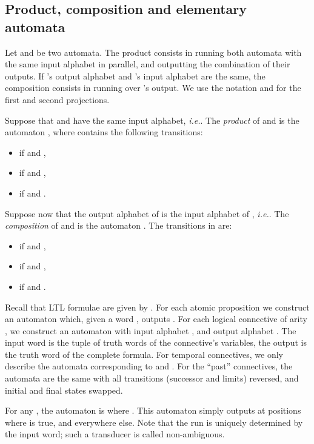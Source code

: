 \documentclass[envcountsame]{fsttcs-ps}
\newcommand{\ie}{\textit{i.e.}\xspace}
\begin{document}
\subsection{Product, composition and elementary automata}
\label{s:composition}

Let  and
 be two automata.
The product consists in running both automata with the same input alphabet in
parallel, and outputting the combination of their outputs.  If
's output alphabet and 's input alphabet
are the same, the composition consists in running  over
's output.  We use the notation  and
 for the first and second projections.

\begin{definition}
Suppose that  and  have the same input
alphabet, \ie .
The \emph{product} of  and  is the
automaton , where
 contains the following transitions:
\begin{itemize}
\item  if 
and ,
\item  if  and ,
\item  if  and
.
\end{itemize}
\end{definition}

\begin{definition}
Suppose now that the output alphabet of  is the input
alphabet of , \ie .
The \emph{composition}
of  and  is the automaton
.  The transitions in  are:
\begin{itemize}
\item  if 
and ,
\item  if  and
,
\item  if  and
.
\end{itemize}
\end{definition}





Recall that LTL formulae are given by .  For each atomic proposition  we construct an automaton
 which, given a word , outputs .  For each logical
connective of arity , we construct an automaton with input alphabet
, and output alphabet .  The input word is the tuple of
truth words of the connective's variables, the output is the truth word of the
complete formula.  For temporal connectives, we only describe the automata
corresponding to  and .  For the ``past'' connectives, the
automata are the same with all transitions (successor and limits) reversed,
and initial and final states swapped.

For any , the automaton  is
 where .  This automaton simply
outputs  at positions where  is true, and  everywhere else.  Note
that the run is uniquely determined by the input word; such a transducer is
called non-ambiguous.
\end{document}
